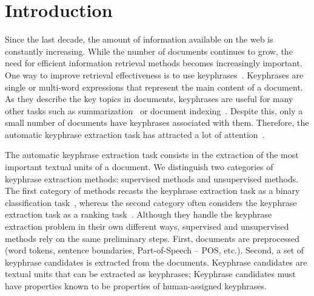 \section{Introduction}
\label{sec:section}

  Since the last decade, the amount of information available on the web is constantly increasing.
  While the number of documents continues to grow, the need for efficient information retrieval methods becomes increasingly important.
  One way to improve retrieval effectiveness is to use keyphrases~\cite{jones1999phrasier}.
  Keyphrases are single or multi-word expressions that represent the main content of a document.
  As they describe the key topics in documents, keyphrases are useful for many other tasks such as summarization~\cite{avanzo2005keyphrase} or document indexing~\cite{medelyan2008smalltrainingset}.
  Despite this, only a small number of documents have keyphrases associated with them.
  Therefore, the automatic keyphrase extraction task has attracted a lot of attention~\cite{kim2010semeval}.


  The automatic keyphrase extraction task consists in the extraction of the
  most important textual units of a document. We distinguish two categories of
  keyphrase extraction methods: supervised methods and unsupervised methods. The
  first category of methods recasts the keyphrase extraction task as a binary
  classification task~\cite{witten1999kea}, whereas the second category often
  considers the keyphrase extraction task as a ranking
  task~\cite{hassan2010conundrums}. Although they handle the keyphrase
  extraction problem in their own different ways, supervised and unsupervised
  methods rely on the same preliminary steps. First, documents are preprocessed
  (word tokens, sentence boundaries, Part-of-Speech -- POS, etc.). Second,
  a set of keyphrase candidates is extracted from the documents. Keyphrase
  candidates are textual units that can be extracted as keyphrases; Keyphrase
  candidates must have properties known to be properties of human-assigned
  keyphrases.
  
